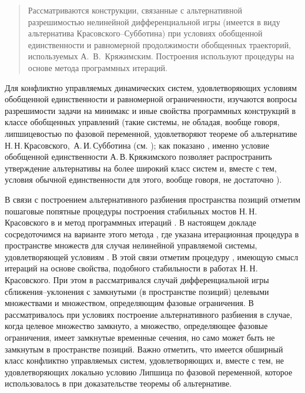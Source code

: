 \begin{abstract}
Рассматриваются конструкции, связанные с альтернативной разрешимостью нелинейной дифференциальной игры (имеется в виду альтернатива Красовского--Субботина) при условиях обобщенной единственности и равномерной продолжимости обобщенных траекторий, используемых А.\, В.\, Кряжимским.
Построения используют процедуры на основе метода программных итераций.

\end{abstract}

Для конфликтно управляемых динамических систем, удовлетворяющих условиям обобщенной единственности и равномерной ограниченности, изучаются вопросы разрешимости задачи на ми\-ни\-макс и иные свойства программных конструкций в классе обобщенных управлений (такие системы, не обладая, вообще говоря, липшицевостью по фазовой переменной, удовлетворяют теореме об альтернативе Н.\,Н.\,Кра\-сов\-ско\-го,\ А.\,И.\,Суб\-бо\-ти\-на (см. \cite{KraSub70PMM,KraSub74});
как показано \cite{Kry78}, именно условие обобщенной единственности А.\,В.\,Кряжимского позволяет распространить утверждение альтернативы на более широкий класс систем и, вместе с тем, условия обычной единственности для этого, вообще говоря, не достаточно \cite{KryDOK}).

В связи с построением альтернативного разбиения пространства позиций отметим пошаговые попятные процедуры построения стабильных мостов Н.\,Н.\,Красовского в \cite{Ushak1980} и метод программных итераций \cite{Chentsov76DAN226,Chentsov2021DU}.
В настоящем докладе сосредоточимся на варианте этого метода \cite[п.\,8]{Chentsov2021DU}, где указана итерационная процедура в пространстве множеств для случая нелинейной управляемой системы, удовлетворяющей условиям \cite{Kry78}.
В этой связи отметим процедуру \cite{ChentsovIMI2017}, имеющую смысл итераций на основе свойства, подобного стабильности в работах Н.\,Н.\,Красовского.
При этом в \cite{KraSub70PMM,KraSub74} рассматривался случай дифференциальной игры сближения--уклонения с замкнутыми (в пространстве позиций) целевыми множествами и множеством, определяющим фазовые ограничения.
В \cite{Chentsov2021DU,ChentsovIMI2017} рассматривалось при условиях \cite{Kry78} построение альтернативного разбиения в случае, когда целевое множество замкнуто, а множество, определяющее фазовые ограничения, имеет замкнутые временные сечения, но само может быть не замкнутым в пространстве позиций.
Важно отметить, что имеется обширный класс конфликтно управляемых систем, удовлетворяющих \cite{Kry78,KryDOK} и, вместе с тем, не удовлетворяющих локально условию Липшица по фазовой переменной, которое использовалось в \cite{KraSub70PMM,KraSub74} при доказательстве теоремы об альтернативе.


